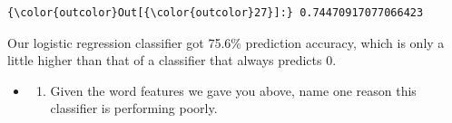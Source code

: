 \documentclass[11pt]{article}
\providecommand{\tightlist}{%
      \setlength{\itemsep}{0pt}\setlength{\parskip}{0pt}}
\begin{document}
\begin{Verbatim}[commandchars=\\\{\}]
{\color{outcolor}Out[{\color{outcolor}27}]:} 0.74470917077066423
\end{Verbatim}
            
    Our logistic regression classifier got 75.6\% prediction accuracy, which
is only a little higher than that of a classifier that always predicts
0.

    \begin{itemize}
\item
  \begin{enumerate}
  \def\labelenumi{(\alph{enumi})}
  \setcounter{enumi}{4}
  \tightlist
  \item
    Given the word features we gave you above, name one reason this
    classifier is performing poorly.
  \end{enumerate}
\end{itemize}
\end{document}
